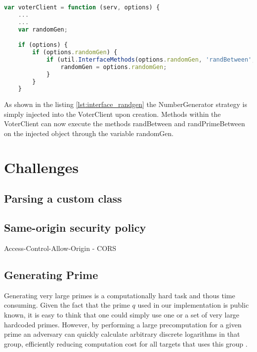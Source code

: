 \begin{lstlisting}[language=Javascript, caption=Checking for an interface, label=lst:interface_randgen]
var voterClient = function (serv, options) {
    ...
    ...
    var randomGen;                     

    if (options) {
        if (options.randomGen) {
            if (util.InterfaceMethods(options.randomGen, 'randBetween', 'randPrimeBetween')) {
                randomGen = options.randomGen;
            }
        }
    } 
\end{lstlisting}
 
\noindent
As shown in the listing \ref{lst:interface_randgen} the NumberGenerator strategy is simply injected
into the VoterClient upon creation. Methods within the VoterClient can now execute the methods
randBetween and randPrimeBetween on the injected object through the variable randomGen. 
 
 

\section{Challenges}

\subsection{Parsing a custom class}


\subsection{Same-origin security policy}
Access-Control-Allow-Origin
- CORS

\subsection{Generating Prime}
Generating very large primes is a computationally hard task and thous time consuming. Given the fact
that the prime $q$ used in our implementation is public known, it is easy to think that one could simply
use one or a set of very large hardcoded primes. However, by performing a large precomputation for a given
prime an adversary can quickly calculate arbitrary discrete logarithms in that group, efficiently reducing 
computation cost for all targets that uses this group \cite{Adrian:2015:IFS:2810103.2813707}. 

